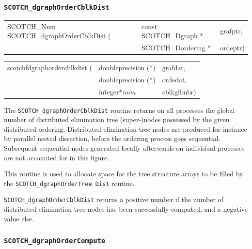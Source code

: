 \subsubsection{{\tt SCOTCH\_dgraphOrderCblkDist}}

\begin{itemize}
\progsyn

{\tt\begin{tabular}{l@{}ll}
SCOTCH\_Num SCOTCH\_dgraphOrderCblkDist ( & const SCOTCH\_Dgraph * & grafptr, \\
                                          & SCOTCH\_Dordering *    & ordeptr)
\end{tabular}}

{\tt\begin{tabular}{l@{}ll}
scotchfdgraphordercblkdist ( & doubleprecision (*) & grafdat, \\
                             & doubleprecision (*) & ordedat, \\
                             & integer*{\it num}   & cblkglbnbr)
\end{tabular}}

\progdes

The {\tt SCOTCH\_dgraphOrderCblkDist} routine returns on all processes
the global number of distributed elimination tree (super-)nodes
possessed by the given distributed ordering. Distributed elimination
tree nodes are produced for instance by parallel nested dissection,
before the ordering process goes sequential. Subsequent sequential
nodes generated locally afterwards on individual processes are not
accounted for in this figure.

This routine is used to allocate space for the tree structure arrays
to be filled by the {\tt SCOTCH\_\lbt dgraph\lbt Order\lbt Tree\lbt
Dist} routine.

\progret

{\tt SCOTCH\_dgraphOrderCblkDist} returns a positive number if the
number of distributed elimination tree nodes has been successfully
computed, and a negative value else.
\end{itemize}

\subsubsection{{\tt SCOTCH\_dgraphOrderCompute}}

